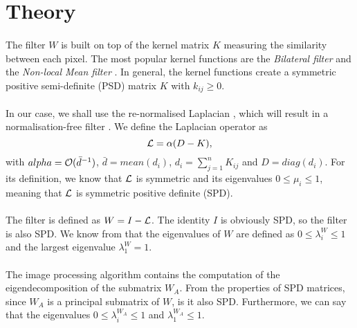 \section{Theory}

\paragraph{}
The filter \(W\) is built on top of the kernel matrix \(K\) measuring the similarity between each pixel.
The most popular kernel functions are the \textit{Bilateral filter} \cite{bilateral_tomasi_1998} and the \textit{Non-local Mean filter} \cite{kervrann_nlm_2006}.
In general, the kernel functions create a symmetric positive semi-definite (PSD) matrix $K$ with \(k_{ij} \ge 0\).

\paragraph{}
In our case, we shall use the re-normalised Laplacian \cite{siam_slides_2016}, which will result in a normalisation-free filter \cite{milanfar_new_2016}.
We define the Laplacian operator as
\[\operatorname{\mathcal{L}} = \alpha (D - K),\]
with \(alpha = \operatorname{\mathcal{O}} (\bar{d}^{-1})\), \(\bar{d} = mean(d_i)\), \(d_i = \sum^n_{j=1} K_{ij}\) and \(D = diag(d_i)\).
For its definition, we know that \(\operatorname{\mathcal{L}}\) is symmetric and its eigenvalues \(0 \le \mu_i \le 1\), meaning that \(\operatorname{\mathcal{L}}\) is symmetric positive definite (SPD).

\paragraph{}
The filter is defined as \(W = I - \operatorname{\mathcal{L}}\). The identity \(I\) is obviously SPD, so the filter is also SPD.
We know from \cite{glide_2014} that the eigenvalues of \(W\) are defined as \(0 \le \lambda^W_i \le 1\) and the largest eigenvalue \(\lambda^W_1 = 1\).

\paragraph{}
The image processing algorithm contains the computation of the eigendecomposition of the submatrix \(W_A\).
From the properties of SPD matrices, since \(W_A\) is a principal submatrix of \(W\), is it also SPD.
Furthermore, we can say that the eigenvalues \(0 \le \lambda^{W_A}_i \le 1\) and \(\lambda^{W_A}_1 \le 1\).

